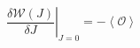 \begin{equation}
\left. \frac{\delta \mathcal{W}(J)}{\delta J}\right| _{J=0}=-\left\langle%
\mathcal{O}\right\rangle  \label{fd}
\end{equation}

